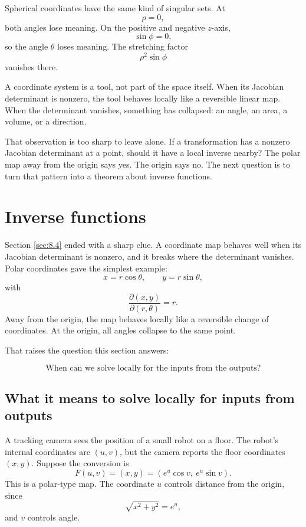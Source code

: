 Spherical coordinates have the same kind of singular sets.  At
\[
    \rho=0,
\]
both angles lose meaning.  On the positive and negative \(z\)-axis,
\[
    \sin\phi=0,
\]
so the angle \(\theta\) loses meaning.  The stretching factor
\[
    \rho^2\sin\phi
\]
vanishes there.

A coordinate system is a tool, not part of the space itself.  When its Jacobian determinant
is nonzero, the tool behaves locally like a reversible linear map.  When the determinant
vanishes, something has collapsed: an angle, an area, a volume, or a direction.

That observation is too sharp to leave alone.  If a transformation has a nonzero Jacobian
determinant at a point, should it have a local inverse nearby?  The polar map away from
the origin says yes.  The origin says no.  The next question is to turn that pattern into a
theorem about inverse functions.

\section{Inverse functions}
\label{sec:8.5}

Section \ref{sec:8.4} ended with a sharp clue.  A coordinate map behaves well when
its Jacobian determinant is nonzero, and it breaks where the determinant vanishes.
Polar coordinates gave the simplest example:
\[
    x=r\cos\theta,\qquad y=r\sin\theta,
\]
with
\[
    \frac{\partial(x,y)}{\partial(r,\theta)}=r.
\]
Away from the origin, the map behaves locally like a reversible change of coordinates.
At the origin, all angles collapse to the same point.

That raises the question this section answers:

\[
    \text{When can we solve locally for the inputs from the outputs?}
\]

\subsection{What it means to solve locally for inputs from outputs}

A tracking camera sees the position of a small robot on a floor.  The robot's internal
coordinates are \((u,v)\), but the camera reports the floor coordinates \((x,y)\).  Suppose
the conversion is
\[
    F(u,v)=(x,y)=(e^u\cos v,\ e^u\sin v).
\]
This is a polar-type map.  The coordinate \(u\) controls distance from the origin, since
\[
    \sqrt{x^2+y^2}=e^u,
\]
and \(v\) controls angle.

